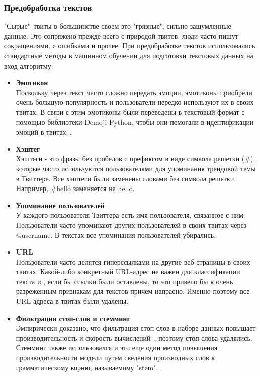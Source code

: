 \documentclass{article}
\begin{document}
\subsubsection{Предобработка текстов}
"Сырые"\ твиты в большинстве своем это "грязные"{}, сильно зашумленные данные. Это сопряжено прежде всего с природой твитов: люди часто пишут сокращениями, с ошибками и прочее. При предобработке текстов использовались стандартные методы в машинном обучении для подготовки текстовых данных на вход алгоритму:
\begin{itemize}
    \item {\bfseries Эмотикон}\\
    Поскольку через текст часто сложно передать эмоции, эмотиконы приобрели очень большую популярность и пользователи нередко используют их в своих твитах. В связи с этим эмотиконы были переведены в текстовый формат с помощью библиотеки Demoji Python, чтобы они помогали в идентификации эмоций в твитах~\cite{wolny}.
    \item {\bfseries Хэштег}\\
    Хэштеги - это фразы без пробелов с префиксом в виде символа решетки (\#), которые часто используются пользователями для упоминания трендовой темы в Твиттере. Все хэштеги были заменены словами без символа решетки. Например, \#hello заменяется на hello. 
    \item{\bfseries Упоминание пользователей}\\
    У каждого пользователя Твиттера есть имя пользователя, связанное с ним. Пользователи часто упоминают других пользователей в своих твитах через @username. В текстах все упоминания пользователей убирались.
    \item{\bfseries URL}\\
    Пользователи часто делятся гиперссылками на другие веб-страницы в своих твитах. Какой-либо конкретный URL-адрес не важен для классификации текста и , если бы ссылки были оставлены, то это привело бы к очень разреженным признакам для текстов причем напрасно. Именно поэтому 
все URL-адреса в твитах были удалены.
    \item{\bfseries Фильтрация стоп-слов и стемминг}\\
    Эмпирически доказано, что фильтрация стоп-слов в наборе данных повышает производительность и скорость вычислений~\cite{saif}, поэтому стоп-слова удалялись. Стемминг также использовался и это еще один метод повышения производительности модели путем сведения производных слов к грамматическому корню, называемому "stem".
\end{itemize}
\end{document}
